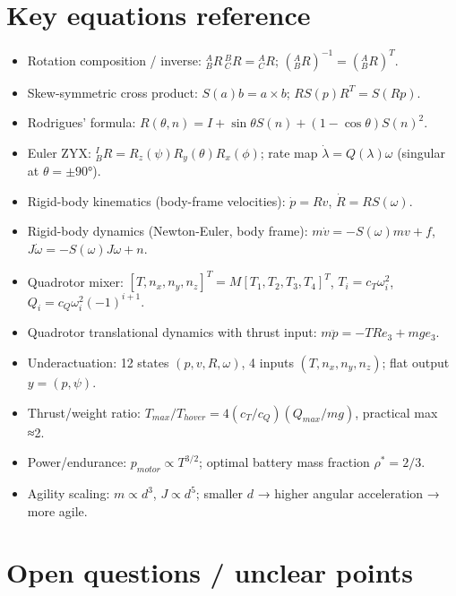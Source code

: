 \documentclass[11pt]{article}
\begin{document}
\section{Key equations reference}

\begin{itemize}
\item Rotation composition / inverse: ${}^A_BR\,{}^B_CR={}^A_CR$; $({}^A_BR)^{-1}=({}^A_BR)^T$.
\item Skew-symmetric cross product: $S(a)b=a\times b$; $RS(p)R^T=S(Rp)$.
\item Rodrigues' formula: $R(\theta,n)=I+\sin\theta S(n)+(1-\cos\theta)S(n)^2$.
\item Euler ZYX: ${}^I_BR=R_z(\psi)R_y(\theta)R_x(\phi)$; rate map $\dot\lambda=Q(\lambda)\omega$ (singular at $\theta=\pm90°$).
\item Rigid-body kinematics (body-frame velocities): $\dot p=Rv$, $\dot R=RS(\omega)$.
\item Rigid-body dynamics (Newton-Euler, body frame): $m\dot v=-S(\omega)mv+f$, $J\dot\omega=-S(\omega)J\omega+n$.
\item Quadrotor mixer: $[T,n_x,n_y,n_z]^T=M[T_1,T_2,T_3,T_4]^T$, $T_i=c_T\omega_i^2$, $Q_i=c_Q\omega_i^2(-1)^{i+1}$.
\item Quadrotor translational dynamics with thrust input: $m\ddot p=-TRe_3+mge_3$.
\item Underactuation: 12 states $(p,v,R,\omega)$, 4 inputs $(T,n_x,n_y,n_z)$; flat output $y=(p,\psi)$.
\item Thrust/weight ratio: $T_{max}/T_{hover}=4(c_T/c_Q)(Q_{max}/mg)$, practical max ≈2.
\item Power/endurance: $p_{motor}\propto T^{3/2}$; optimal battery mass fraction $\rho^*=2/3$.
\item Agility scaling: $m\propto d^3$, $J\propto d^5$; smaller $d$ → higher angular acceleration → more agile.
\end{itemize}

\section{Open questions / unclear points}
\end{document}
